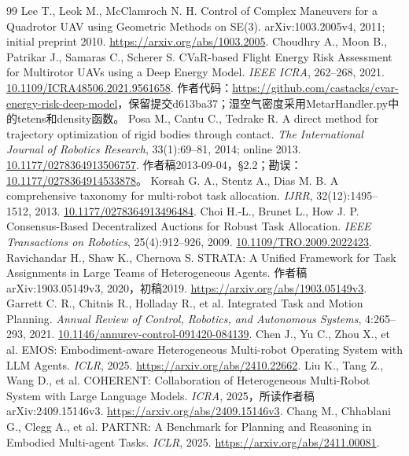 \begin{thebibliography}{99}
 Lee T., Leok M., McClamroch N. H. Control of Complex Maneuvers for a Quadrotor UAV using Geometric Methods on SE(3). arXiv:1003.2005v4, 2011; initial preprint 2010. \url{https://arxiv.org/abs/1003.2005}.
 Choudhry A., Moon B., Patrikar J., Samaras C., Scherer S. CVaR-based Flight Energy Risk Assessment for Multirotor UAVs using a Deep Energy Model. \emph{IEEE ICRA}, 262--268, 2021. \href{https://doi.org/10.1109/ICRA48506.2021.9561658}{10.1109/ICRA48506.2021.9561658}. 作者代码：\url{https://github.com/castacks/cvar-energy-risk-deep-model}，保留提交d613ba37；湿空气密度采用MetarHandler.py中的tetens和density函数。
 Posa M., Cantu C., Tedrake R. A direct method for trajectory optimization of rigid bodies through contact. \emph{The International Journal of Robotics Research}, 33(1):69--81, 2014; online 2013. \href{https://doi.org/10.1177/0278364913506757}{10.1177/0278364913506757}. 作者稿2013-09-04，§2.2；勘误：\href{https://doi.org/10.1177/0278364914533878}{10.1177/0278364914533878}。
 Korsah G. A., Stentz A., Dias M. B. A comprehensive taxonomy for multi-robot task allocation. \emph{IJRR}, 32(12):1495--1512, 2013. \href{https://doi.org/10.1177/0278364913496484}{10.1177/0278364913496484}.
 Choi H.-L., Brunet L., How J. P. Consensus-Based Decentralized Auctions for Robust Task Allocation. \emph{IEEE Transactions on Robotics}, 25(4):912--926, 2009. \href{https://doi.org/10.1109/TRO.2009.2022423}{10.1109/TRO.2009.2022423}.
 Ravichandar H., Shaw K., Chernova S. STRATA: A Unified Framework for Task Assignments in Large Teams of Heterogeneous Agents. 作者稿arXiv:1903.05149v3, 2020，初稿2019. \url{https://arxiv.org/abs/1903.05149v3}.
 Garrett C. R., Chitnis R., Holladay R., et al. Integrated Task and Motion Planning. \emph{Annual Review of Control, Robotics, and Autonomous Systems}, 4:265--293, 2021. \href{https://doi.org/10.1146/annurev-control-091420-084139}{10.1146/annurev-control-091420-084139}.
 Chen J., Yu C., Zhou X., et al. EMOS: Embodiment-aware Heterogeneous Multi-robot Operating System with LLM Agents. \emph{ICLR}, 2025. \url{https://arxiv.org/abs/2410.22662}.
 Liu K., Tang Z., Wang D., et al. COHERENT: Collaboration of Heterogeneous Multi-Robot System with Large Language Models. \emph{ICRA}, 2025，所读作者稿arXiv:2409.15146v3. \url{https://arxiv.org/abs/2409.15146v3}.
 Chang M., Chhablani G., Clegg A., et al. PARTNR: A Benchmark for Planning and Reasoning in Embodied Multi-agent Tasks. \emph{ICLR}, 2025. \url{https://arxiv.org/abs/2411.00081}.

\end{thebibliography}
